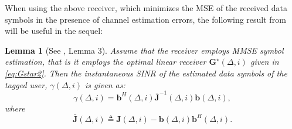 \documentclass[conference, a4paper, 10pt]{IEEEtran}
\newtheorem{lem}{Lemma}
\newcommand{\mx}[1]{\mathbf{#1}}
\newcommand{\bs}[1]{\boldsymbol{#1}}
\begin{document}
When using the above receiver, which minimizes the \ac{MSE} of the received data symbols in the
presence of channel estimation errors, the following result from \cite{Fodor:22} will be useful in the sequel:
\begin{lem}[See \cite{Fodor:22}, Lemma 3]
Assume that
the receiver employs \textup{\ac{MMSE}} symbol estimation,
that is it employs the optimal linear receiver $\mx{G}^\star(\Delta, i)$ given in \eqref{eq:Gstar2}. %
Then the instantaneous \textup{\ac{SINR}} of the estimated data symbols of the tagged user,
$\gamma(\Delta, i)$ %
is given as:
%
\begin{equation}
\label{eq:lemma2Eq}
\gamma(\Delta, i) %
=
\mx{b}^H(\Delta, i) \mathbf{\bar{J}}^{-1}(\Delta, i) \mx{b}(\Delta, i),
\end{equation}
where
\vspace{-1mm}
\begin{equation}
\mathbf{\bar{J}}(\Delta, i) \triangleq \mathbf{J}(\Delta, i)- \mx{b}(\Delta, i)\mx{b}^H(\Delta, i).
\end{equation}
\end{lem}
\begin{comment}
Using the \ac{MMSE} estimate $\bar{\mx{h}}(i) = \mx{E}(i) \mx{\hat{\bar{h}}}(\Delta)$ of the channel $\mx{h}(i)$,
we can calculate the \ac{SINR} of the estimated data symbol sent at time $i$ when the \ac{BS} employs an optimal linear receiver as provided in \cite{Fodor:22}.
Lemma 2 in \cite{Fodor:22} shows that when $K$ \acp{MS} enumerated $k = 1 \ldots K$ transmit data signals
through channels $\mx{h}_k$ with \ac{MMSE} estimates
$\bar{\mx{h}}_k$, estimation error covariance $\mx{Z}_k$, path losses $\alpha_k$,
and employing transmit powers $P_k$, the \ac{SINR} of the estimated data symbol of user $k$, $\hat x = \mx{G}\mx{y}$:

\begin{align}
    \gamma_k = \alpha_k^2 P_k \bar{\mx{h}}_k^H \left( \sum_{l \neq k}^K \alpha_l^2 P_l \bar{\mx{h}}_l\bar{\mx{h}}_l^H
    + \sum_{l = 1}^K \alpha_l^2 P_l \mx{Z}_l + \sigma_d^2 \mx{I} \right)^{-1}\bar{\mx{h}}_k,
\end{align}

where $\sigma_d^2$ is the variance of the \ac{AWGN} on the data signal.
Applying this formula on the previous section, where the data symbol of User-$k$, in data time slot $i$ is transmitted through the channel $\mx{h}_k(iT)$,
with \ac{MMSE} estimate $\bar{\mx{h}}_k(iT) = \mx{E}_k(i) \bs{\zeta}_k(\Delta)$ and channel covariance matrix $\mx{Z}(i)$
the \ac{SINR} of the estimated data symbol sent by User-$k$ is given by
\end{comment}
\end{document}
